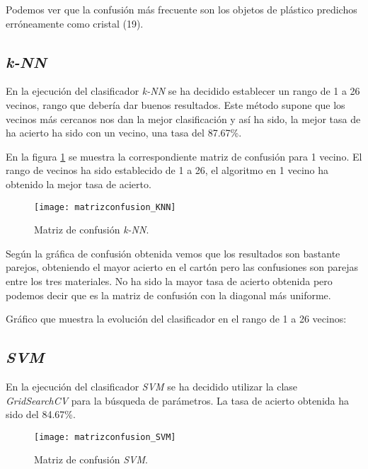 Podemos ver que la confusión más frecuente son los objetos de plástico predichos erróneamente como cristal (19).

\clearpage

\subsection{\textit{k-NN}}

En la ejecución del clasificador \textit{k-NN} se ha decidido establecer un rango de 1 a 26 vecinos, rango que debería dar buenos resultados. Este método supone que los vecinos más cercanos nos dan la mejor clasificación y así ha sido, la mejor tasa de ha acierto ha sido con un vecino, una tasa del 87.67\%.

En la figura \ref{fig:matrizconfusion_KNN} se muestra la correspondiente matriz de confusión para 1 vecino. El rango de vecinos ha sido establecido de 1 a 26, el algoritmo en 1 vecino ha obtenido la mejor tasa de acierto.

\begin{figure}[h]
\begin{center}
	\texttt{[image: matrizconfusion\_KNN]}
	\caption{Matriz de confusión \textit{k-NN}.}
	\label{fig:matrizconfusion_KNN}
\end{center}
\end{figure}

Según la gráfica de confusión obtenida vemos que los resultados son bastante parejos, obteniendo el mayor acierto en el cartón pero las confusiones son parejas entre los tres materiales. No ha sido la mayor tasa de acierto obtenida pero podemos decir que es la matriz de confusión con la diagonal más uniforme.

\clearpage

Gráfico que muestra la evolución del clasificador en el rango de 1 a 26 vecinos:


\clearpage

\subsection{\textit{SVM}}

En la ejecución del clasificador \textit{SVM} se ha decidido utilizar la clase \textit{GridSearchCV} para la búsqueda de parámetros. La tasa de acierto obtenida ha sido del 84.67\%.

\begin{figure}[h]
\begin{center}
	\texttt{[image: matrizconfusion\_SVM]}
	\caption{Matriz de confusión \textit{SVM}.}
	\label{fig:matrizconfusion_SVM}
\end{center}
\end{figure}

